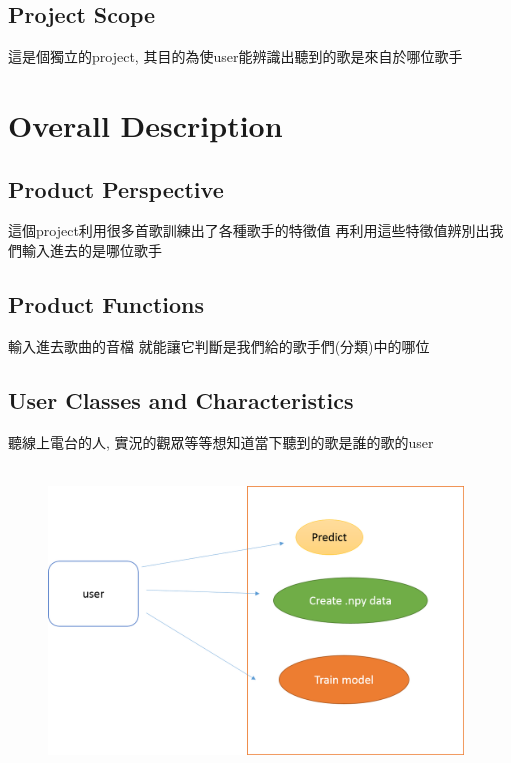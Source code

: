 \documentclass{article}
\begin{document}
\begin{CJK}{UTF8}{bkai}
\subsection{Project Scope\\}
這是個獨立的project, 
其目的為使user能辨識出聽到的歌是來自於哪位歌手

\newpage


\section{\huge\bf \color{blue}  Overall Description\\}

\subsection{\Large Product Perspective\\}
 \large 這個project利用很多首歌訓練出了各種歌手的特徵值 再利用這些特徵值辨別出我們輸入進去的是哪位歌手\\

\subsection{\Large Product Functions}
\large 輸入進去歌曲的音檔 就能讓它判斷是我們給的歌手們(分類)中的哪位\\

\subsection{\Large User Classes and Characteristics\\}
  \Large 聽線上電台的人, 實況的觀眾等等想知道當下聽到的歌是誰的歌的user\\\\%
\begin{figure}[h]
\begin{center}
\includegraphics[width=11cm]{user.png}
\end{center}
\label{fig:1}
\end{figure}
\newpage

\end{CJK}
\end{document}
